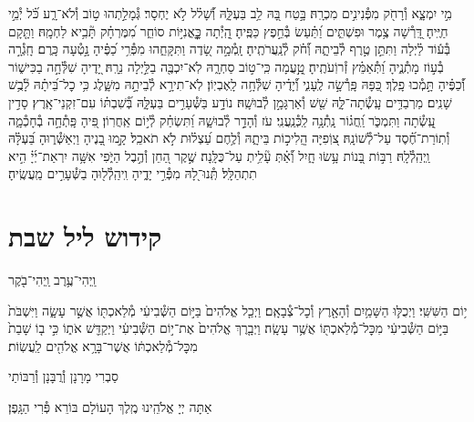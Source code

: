 \documentclass[twoside, openany, parskip=half, 11pt]{book}
\begin{document}
מִ֣י יִמְצָ֑א וְ֯רָחֹ֖ק מִפְּ֯נִינִ֣ים מִכְרָֽהּ׃ \hfill \break
בָּ֣טַח בָּ֭הּ לֵ֥ב בַּעְלָּ֑הּ וְ֝֯שָׁל֗ל לֹ֣א יֶחְסָר׃ \hfill \break
גְּ֯מָלַ֣תְהוּ ט֣וֹב וְ֯לֹא־רָ֑ע כֹּ֝֗ל יְ֯מֵ֣י חַיֶּֽיהָ׃ \hfill \break
דָּֽ֭רְ֯שָׁה צֶ֥מֶר וּפִשְׁתִּ֑ים וַ֝תַּ֗עַשׂ בְּ֯חֵ֣פֶץ כַּפֶּֽיהָ׃ \hfill \break
הָֽ֭יְ֯תָה כׇׇׇׇׇׇׇׇׇּֽאֳנִיּ֣וֹת סוֹחֵ֑ר מִ֝מֶּרְחָ֗ק תָּ֘בִ֥יא לַחְמָֽהּ׃ \hfill \break
וַתָּ֤קָם בְּ֯ע֬וֹד לַ֗יְלָה וַתִּתֵּ֣ן טֶ֣רֶף לְ֯בֵיתָ֑הּ וְ֝֯חֹ֗ק לְ֯נַֽעֲרֹתֶֽיהָ׃ \hfill \break
זָֽמְ֯מָ֣ה שָׂ֭דֶה וַתִּקָּחֵ֑הוּ מִפְּ֯רִ֥י כַ֝פֶּ֗יהָ נָ֣טְ֯עָה כָּֽרֶם׃ \hfill \break
חָֽגְ֯רָ֣ה בְ֯ע֣וֹז מָתְ֯נֶ֑יהָ וַ֝תְּ֯אַמֵּ֗ץ זְ֯רוֹֽעֹתֶֽיהָ׃ \hfill \break
טָֽ֣֭עֲמָה כִּֽי־ט֣וֹב סַחְרָ֑הּ לֹֽא־יִכְבֶּ֖ה בַלַּ֣יְלָה נֵרָֽהּ׃ \hfill \break
יָ֭דֶיהָ שִׁלְּ֯חָ֣ה בַכִּישׁ֑וֹר וְ֝֯כַפֶּ֗יהָ תָּ֣מְ֯כוּ פָֽלֶךְ׃ \hfill \break
כַּ֭פָּהּ פָּֽרְ֯שָׂ֣ה לֶֽעָנִ֑י וְ֝֯יָדֶ֗יהָ שִׁלְּ֯חָ֥ה לָֽאֶבְיֽוֹן׃ \hfill \break
לֹֽא־תִירָ֣א לְ֯בֵיתָ֣הּ מִשָּׁ֑לֶג כִּ֥י כׇל־בֵּ֝יתָ֗הּ לָ֘בֻ֥שׁ שָׁנִֽים׃ \hfill \break
מַרְבַדִּ֥ים עָֽשְׂ֯תָה־לָּ֑הּ שֵׁ֖שׁ וְ֯אַרְגָּמָ֣ן לְ֯בוּשָֽׁהּ׃ \hfill \break
נוֹדָ֣ע בַּשְּׁ֯עָרִ֣ים בַּעְלָּ֑הּ בְּ֝֯שִׁבְתּ֗וֹ עִם־זִקְנֵי־אָֽרֶץ׃ \hfill \break
סָדִ֣ין עָֽ֭שְׂ֯תָה וַתִּמְכֹּ֑ר וַֽ֝חֲג֗וֹר נָֽתְ֯נָ֥ה לַֽכְּ֯נַֽעֲנִֽי׃ \hfill \break
עֹז וְ֯הָדָ֣ר לְ֯בוּשָׁ֑הּ וַ֝תִּשְׂחַ֗ק לְ֯י֣וֹם אַֽחֲרֽוֹן׃ \hfill \break
פִּ֭יהָ פָּֽתְ֯חָ֣ה בְ֯חָכְ֯מָ֑ה וְ֯תֽוֹרַת־חֶ֝֗סֶד עַל־לְ֯שׁוֹנָֽהּ׃ \hfill \break
צ֭וֹֽפִיָּה הֲֽלִיכ֣וֹת בֵּיתָ֑הּ וְ֯לֶ֥חֶם עַ֝צְל֗וּת לֹ֣א תֹאכֵֽל׃ \hfill \break
קָ֣מוּ בָ֭נֶיהָ וַיְאַשְּׁ֯ר֑וּהָ בַּ֝עְלָּ֗הּ וַֽיְהַֽלְ֯לָֽהּ׃ \hfill \break
רַבּ֣וֹת בָּ֭נוֹת עָ֥שׂוּ חָ֑יִל וְ֝֯אַ֗תְּ עָ֘לִ֥יתְ עַל־כֻּלָּֽנָה׃ \hfill \break
שֶׁ֣קֶר הַ֭חֵן וְ֯הֶ֣בֶל הַיֹּ֑פִי אִשָּׁ֥ה יִרְאַת־יְ֜יָ֗ הִ֣יא תִתְהַלָּֽל׃\hfill \break
תְּֽ֯נוּ־לָ֭הּ מִפְּ֯רִ֣י יָדֶ֑יהָ וִֽיהַֽלְ֯ל֖וּהָ בַשְּׁ֯עָרִ֣ים מַֽעֲשֶֽׂיהָ׃\hfill \break


\section*{ קידוש ליל שבת }

\begin{small}וַֽיְהִי־עֶ֥רֶב וַֽיְהִי־בֹ֖קֶר\end{small}
י֥וֹם הַשִּׁשִּֽׁי׃ וַיְכֻלּ֛וּ הַשָּׁמַ֥יִם וְ֯הָאָ֖רֶץ וְ֯כׇל־צְ֯בָאָֽם׃ וַיְכַ֤ל אֱלֹהִים֙ בַּיּ֣וֹם הַשְּׁ֯בִיעִ֔י מְ֯לַאכְתּ֖וֹ אֲשֶׁ֣ר עָשָׂ֑ה וַיִּשְׁבֹּת֙ בַּיּ֣וֹם הַשְּׁ֯בִיעִ֔י מִכׇּל־מְ֯לַאכְתּ֖וֹ אֲשֶׁ֥ר עָשָֽׂה׃ וַיְבָ֤רֶךְ אֱלֹהִים֙ אֶת־י֣וֹם הַשְּׁ֯בִיעִ֔י וַיְקַדֵּ֖שׁ אֹת֑וֹ כִּ֣י ב֤וֹ שָׁבַת֙ מִכׇּל־מְ֯לַאכְתּ֔וֹ אֲשֶׁר־בָּרָ֥א אֱלֹהִ֖ים לַֽעֲשֽׂוֹת׃

\begin{footnotesize}
סַבְרִי מָרָנָן וְ֯רֲבָּנָן וְ֯רַבּוֹתַי\\
\end{footnotesize}
אַתָּה יְיָ אֱלֹהֵֽינוּ מֶֽלֶךְ הָעוֹלָם בּוֹרֵא פְּ֯רִי הַגָּֽפֶן׃
\end{document}
